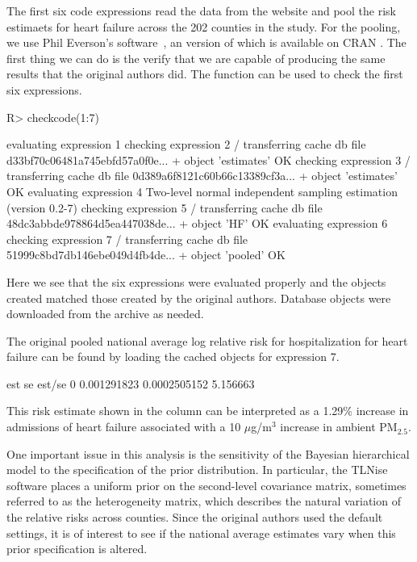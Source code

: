 \documentclass[nojss]{jss}
\newcommand{\PMTwoFive}{PM$_{2.5}$}
\begin{document}
The first six code expressions read the data from the website and pool
the risk estimaets for heart failure across the 202 counties in the
study.  For the pooling, we use Phil Everson's 
software~\citep{ever:morr:2000}, an  version of which is
available on CRAN \citep{tlnise}.  The first thing we can do is the verify that we
are capable of producing the same results that the original authors
did.  The  function can be used to check the first six
expressions.
\begin{Schunk}
\begin{Sinput}
R> checkcode(1:7)
\end{Sinput}
\begin{Soutput}
evaluating expression 1
checking expression 2
/ transferring cache db file d33bf70c06481a745ebfd57a0f0e...
+ object 'estimates' OK
checking expression 3
/ transferring cache db file 0d389a6f8121c60b66c13389cf3a...
+ object 'estimates' OK
evaluating expression 4
Two-level normal independent sampling estimation
(version 0.2-7)
checking expression 5
/ transferring cache db file 48dc3abbde978864d5ea447038de...
+ object 'HF' OK
evaluating expression 6
checking expression 7
/ transferring cache db file 51999c8bd7db146ebe049d4fb4de...
+ object 'pooled' OK
\end{Soutput}
\end{Schunk}
Here we see that the six expressions were evaluated properly and the
objects created matched those created by the original authors.
Database objects were downloaded from the archive as needed.

The original pooled national average log relative risk for
hospitalization for heart failure can be found by loading the cached
objects for expression 7.
\begin{Schunk}
\begin{Soutput}
          est           se   est/se
0 0.001291823 0.0002505152 5.156663
\end{Soutput}
\end{Schunk}
This risk estimate shown in the  column can be interpreted
as a 1.29\% increase in
admissions of heart failure associated with a 10 $\mu$g/m$^3$ increase
in ambient \PMTwoFive.

One important issue in this analysis is the sensitivity of the
Bayesian hierarchical model to the specification of the prior
distribution.  In particular, the TLNise software places a uniform
prior on the second-level covariance matrix, sometimes referred to as
the heterogeneity matrix, which describes the natural variation of the
relative risks across counties.  Since the original authors used the
default settings, it is of interest to see if the national average
estimates vary when this prior specification is altered.
\end{document}
